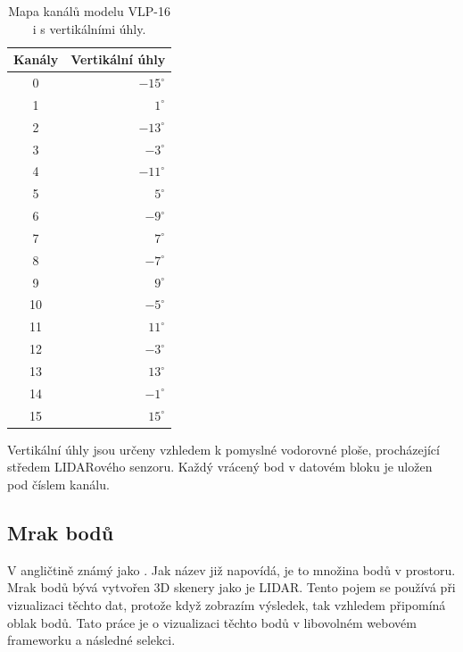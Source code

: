 \documentclass[czech,bachelor,dept420,male,cpdeclaration]{diploma}
\begin{document}
\begin{table}[!htbp]
\centering
\caption{Mapa kanálů modelu VLP-16 i s vertikálními úhly.}
\label{tab:tab1}
\begin{tabular}{|c|r|}
\hline
Kanály & Vertikální úhly	\\
\hline
0 &   $-15^\circ$   \\
1 &   $1^\circ$	  \\
2 &   $-13^\circ$  \\
3 &   $-3^\circ$   \\
4 &   $-11^\circ$  \\
5 &   $5^\circ$    \\
6 &   $-9^\circ$   \\
7 &   $7^\circ$    \\
8 &   $-7^\circ$   \\
9 &   $9^\circ$    \\
10 &  $-5^\circ$  \\
11 &  $11^\circ$  \\
12 &  $-3^\circ$  \\
13 &  $13^\circ$  \\
14 &  $-1^\circ$  \\
15 &  $15^\circ$  \\
\hline
\end{tabular}
\end{table}

Vertikální úhly jsou určeny vzhledem k pomyslné vodorovné ploše, procházející středem LIDARového senzoru. Každý vrácený bod v datovém bloku je uložen pod číslem kanálu. 
 
\subsection{Mrak bodů}
V angličtině známý jako . Jak název již napovídá, je to množina bodů v prostoru. Mrak bodů bývá vytvořen 3D skenery jako je LIDAR. Tento pojem se používá při vizualizaci těchto dat, protože když zobrazím výsledek, tak vzhledem připomíná oblak bodů. Tato práce je o vizualizaci těchto bodů v libovolném webovém frameworku a následné selekci.
\end{document}
